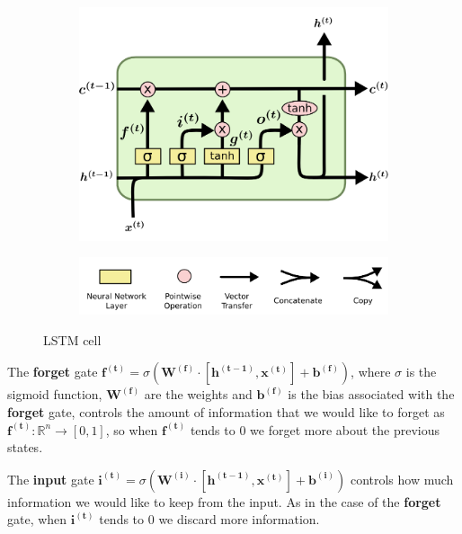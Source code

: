 \begin{figure}[h]
  \centering
  \begin{subfigure}[b]{0.6\linewidth}
    \includegraphics[width=\linewidth]{images/lstm_archi_cell.png}
  \end{subfigure}
  \hfill
  \begin{subfigure}[b]{0.6\linewidth}
    \includegraphics[width=\linewidth]{images/LSTM2-notation.png}
  \end{subfigure}
  \caption{LSTM cell \cite{LSTM_blog}}
  \label{fig:LSTM}
\end{figure}

The \textbf{forget} gate $\boldsymbol{f^{(t)}} = \sigma(\boldsymbol{W^{(f)}} \cdot [\boldsymbol{h^{(t - 1)}}, \boldsymbol{x^{(t)}}] + \boldsymbol{b^{(f)}})$, where $\sigma$ is the sigmoid function, $\boldsymbol{W^{(f)}}$ are the weights and $\boldsymbol{b^{(f)}}$ is the bias associated with the \textbf{forget} gate, controls the amount of information that we would like to forget as $\boldsymbol{f^{(t)}} \colon \mathbb{R}^n \xrightarrow{} [0, 1]$, so when $\boldsymbol{f^{(t)}}$ tends to 0 we forget more about the previous states.

The \textbf{input} gate $\boldsymbol{i^{(t)}} = \sigma(\boldsymbol{W^{(i)}} \cdot [\boldsymbol{h^{(t - 1)}}, \boldsymbol{x^{(t)}}] + \boldsymbol{b^{(i)}})$ controls how much information we would like to keep from the input. As in the case of the \textbf{forget} gate, when $\boldsymbol{i^{(t)}}$ tends to 0 we discard more information.

